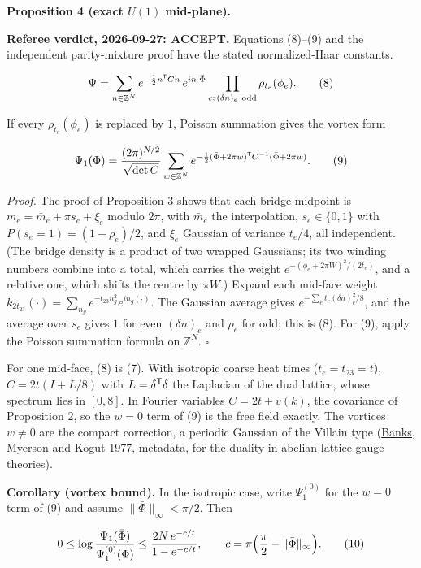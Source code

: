 \documentclass[11pt,a4paper]{article}
\begin{document}
\textbf{Proposition 4 (exact \(U(1)\) mid-plane).}

\textbf{Referee verdict, 2026-09-27: ACCEPT.} Equations (8)--(9) and the
independent parity-mixture proof have the stated normalized-Haar
constants.

\[\Psi=\sum_{n\in\mathbb Z^N}e^{-\frac12n^{\sf T}Cn}\,e^{in\cdot\bar\Phi}
\prod_{e:\,(\delta n)_e\ {\rm odd}}\rho_{t_e}(\phi_e). \tag{8}\]

If every \(\rho_{t_e}(\phi_e)\) is replaced by \(1\), Poisson summation
gives the vortex form

\[\Psi_1(\bar\Phi)=\frac{(2\pi)^{N/2}}{\sqrt{\det C}}
\sum_{w\in\mathbb Z^N}
e^{-\frac12(\bar\Phi+2\pi w)^{\sf T}C^{-1}(\bar\Phi+2\pi w)}. \tag{9}\]

\emph{Proof.} The proof of Proposition 3 shows that each bridge midpoint
is \(m_e=\bar m_e+\pi s_e+\xi_e\) modulo \(2\pi\), with \(\bar m_e\) the
interpolation, \(s_e\in\{0,1\}\) with \(P(s_e=1)=(1-\rho_e)/2\), and
\(\xi_e\) Gaussian of variance \(t_e/4\), all independent. (The bridge
density is a product of two wrapped Gaussians; its two winding numbers
combine into a total, which carries the weight
\(e^{-(\phi_e+2\pi W)^2/(2t_e)}\), and a relative one, which shifts the
centre by \(\pi W\).) Expand each mid-face weight
\(k_{2t_{23}}(\cdot)=\sum_{n_g}e^{-t_{23}n_g^2}e^{in_g(\cdot)}\). The
Gaussian average gives \(e^{-\sum_et_e(\delta n)_e^2/8}\), and the
average over \(s_e\) gives \(1\) for even \((\delta n)_e\) and
\(\rho_e\) for odd; this is (8). For (9), apply the Poisson summation
formula on \(\mathbb Z^N\). \(\square\)

For one mid-face, (8) is (7). With isotropic coarse heat times
(\(t_e=t_{23}=t\)), \(C=2t(I+L/8)\) with \(L=\delta^{\sf T}\delta\) the
Laplacian of the dual lattice, whose spectrum lies in \([0,8]\). In
Fourier variables \(C=2t+v(k)\), the covariance of Proposition 2, so the
\(w=0\) term of (9) is the free field exactly. The vortices \(w\ne0\)
are the compact correction, a periodic Gaussian of the Villain type
(\href{https://doi.org/10.1016/0550-3213(77)90129-8}{Banks, Myerson and
Kogut 1977}, metadata, for the duality in abelian lattice gauge
theories).

\textbf{Corollary (vortex bound).} In the isotropic case, write
\(\Psi_1^{(0)}\) for the \(w=0\) term of (9) and assume
\(\|\bar\Phi\|_\infty<\pi/2\). Then

\[0\le\log\frac{\Psi_1(\bar\Phi)}{\Psi_1^{(0)}(\bar\Phi)}
\le\frac{2N\,e^{-c/t}}{1-e^{-c/t}},\qquad
c=\pi\Bigl(\frac\pi2-\|\bar\Phi\|_\infty\Bigr). \tag{10}\]
\end{document}
